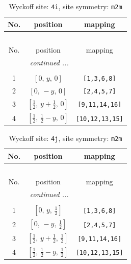 \documentclass[fleqn,8pt]{jsarticle}
\begin{document}
\renewcommand{\arraystretch}{1.2}
\begin{longtable}{ccc}
\caption{Wyckoff site: {\tt 4i}, site symmetry: {\tt m2m}}
 \\
 \hline \hline
No. & position & mapping \\ \hline \endfirsthead

\multicolumn{2}{l}{\tablename\ \thetable{}} \\
 \hline \hline
No. & position & mapping \\ \hline \endhead

 \hline \hline
\multicolumn{2}{r}{\footnotesize\it continued ...} \\ \endfoot

 \hline \hline
\multicolumn{2}{r}{} \\ \endlastfoot

1 & $\left[ 0,\, y,\, 0 \right]$ & {\tt [1,3,6,8]} \\ \hline
2 & $\left[ 0,\, - y,\, 0 \right]$ & {\tt [2,4,5,7]} \\ \hline
3 & $\left[ \frac{1}{2},\, y + \frac{1}{2},\, 0 \right]$ & {\tt [9,11,14,16]} \\ \hline
4 & $\left[ \frac{1}{2},\, \frac{1}{2} - y,\, 0 \right]$ & {\tt [10,12,13,15]} \\
\end{longtable}
\renewcommand{\arraystretch}{1.2}
\begin{longtable}{ccc}
\caption{Wyckoff site: {\tt 4j}, site symmetry: {\tt m2m}}
 \\
 \hline \hline
No. & position & mapping \\ \hline \endfirsthead

\multicolumn{2}{l}{\tablename\ \thetable{}} \\
 \hline \hline
No. & position & mapping \\ \hline \endhead

 \hline \hline
\multicolumn{2}{r}{\footnotesize\it continued ...} \\ \endfoot

 \hline \hline
\multicolumn{2}{r}{} \\ \endlastfoot

1 & $\left[ 0,\, y,\, \frac{1}{2} \right]$ & {\tt [1,3,6,8]} \\ \hline
2 & $\left[ 0,\, - y,\, \frac{1}{2} \right]$ & {\tt [2,4,5,7]} \\ \hline
3 & $\left[ \frac{1}{2},\, y + \frac{1}{2},\, \frac{1}{2} \right]$ & {\tt [9,11,14,16]} \\ \hline
4 & $\left[ \frac{1}{2},\, \frac{1}{2} - y,\, \frac{1}{2} \right]$ & {\tt [10,12,13,15]} \\
\end{longtable}
\end{document}
